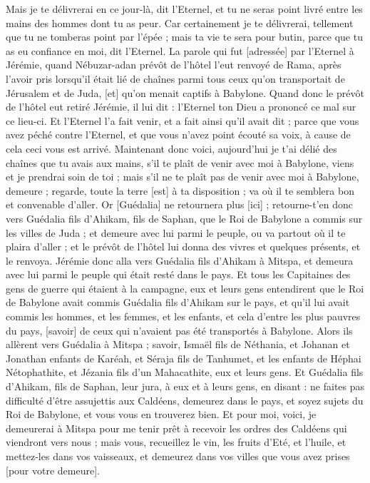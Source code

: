 \begin{multicols}{2}
Mais je te délivrerai en ce jour-là, dit l'Eternel, et tu ne seras point livré entre les mains des hommes dont tu as peur.
Car certainement je te délivrerai, tellement que tu ne tomberas point par l'épée ; mais ta vie te sera pour butin, parce que tu as eu confiance en moi, dit l'Eternel.
\VerseOne{}La parole qui fut [adressée] par l'Eternel à Jérémie, quand Nébuzar-adan prévôt de l'hôtel l'eut renvoyé de Rama, après l'avoir pris lorsqu'il était lié de chaînes parmi tous ceux qu'on transportait de Jérusalem et de Juda, [et] qu'on menait captifs à Babylone.
Quand donc le prévôt de l'hôtel eut retiré Jérémie, il lui dit : l'Eternel ton Dieu a prononcé ce mal sur ce lieu-ci.
Et l'Eternel l'a fait venir, et a fait ainsi qu'il avait dit ; parce que vous avez péché contre l'Eternel, et que vous n'avez point écouté sa voix, à cause de cela ceci vous est arrivé.
Maintenant donc voici, aujourd'hui je t'ai délié des chaînes que tu avais aux mains, s'il te plaît de venir avec moi à Babylone, viens et je prendrai soin de toi ; mais s'il ne te plaît pas de venir avec moi à Babylone, demeure ; regarde, toute la terre [est] à ta disposition ; va où il te semblera bon et convenable d'aller.
Or [Guédalia] ne retournera plus [ici] ; retourne-t'en donc vers Guédalia fils d'Ahikam, fils de Saphan, que le Roi de Babylone a commis sur les villes de Juda ; et demeure avec lui parmi le peuple, ou va partout où il te plaira d'aller ; et le prévôt de l'hôtel lui donna des vivres et quelques présents, et le renvoya.
Jérémie donc alla vers Guédalia fils d'Ahikam à Mitspa, et demeura avec lui parmi le peuple qui était resté dans le pays.
Et tous les Capitaines des gens de guerre qui étaient à la campagne, eux et leurs gens entendirent que le Roi de Babylone avait commis Guédalia fils d'Ahikam sur le pays, et qu'il lui avait commis les hommes, et les femmes, et les enfants, et cela d'entre les plus pauvres du pays, [savoir] de ceux qui n'avaient pas été transportés à Babylone.
Alors ils allèrent vers Guédalia à Mitspa ; savoir, Ismaël fils de Néthania, et Johanan et Jonathan enfants de Karéah, et Séraja fils de Tanhumet, et les enfants de Héphai Nétophathite, et Jézania fils d'un Mahacathite, eux et leurs gens.
Et Guédalia fils d'Ahikam, fils de Saphan, leur jura, à eux et à leurs gens, en disant : ne faites pas difficulté d'être assujettis aux Caldéens, demeurez dans le pays, et soyez sujets du Roi de Babylone, et vous vous en trouverez bien.
Et pour moi, voici, je demeurerai à Mitspa pour me tenir prêt à recevoir les ordres des Caldéens qui viendront vers nous ; mais vous, recueillez le vin, les fruits d'Eté, et l'huile, et mettez-les dans vos vaisseaux, et demeurez dans vos villes que vous avez prises [pour votre demeure].

\end{multicols}
